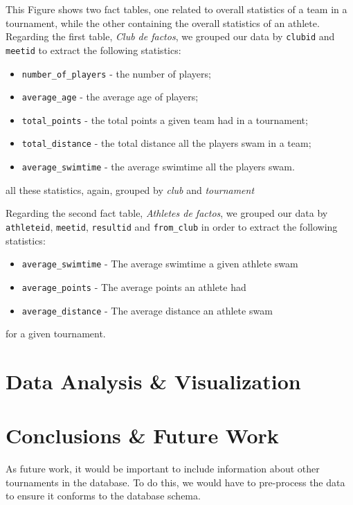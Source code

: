 \documentclass[a4paper, 11pt]{article}
\begin{document}
This Figure shows two fact tables, one related to overall statistics of a team in a tournament, while the other containing the overall statistics of an athlete. Regarding the first table, \textit{Club de factos}, we grouped our data by \texttt{clubid} and \texttt{meetid} to extract the following statistics:

\begin{itemize}
    \item \texttt{number\_of\_players} - the number of players;
    
    \item \texttt{average\_age} - the average age of players;
    
    \item \texttt{total\_points} - the total points a given team had in a tournament;
    \item \texttt{total\_distance} - the total distance all the players swam in a team;
    \item \texttt{average\_swimtime} - the average swimtime all the players swam.
\end{itemize}

all these statistics, again, grouped by \textit{club} and \textit{tournament}

Regarding the second fact table, \textit{Athletes de factos}, we grouped our data by \texttt{athleteid}, \texttt{meetid}, \texttt{resultid} and \texttt{from\_club} in order to extract the following statistics:

\begin{itemize}
    \item \texttt{average\_swimtime} - The average swimtime a given athlete swam
    \item \texttt{average\_points} - The average points an athlete had
    \item \texttt{average\_distance} - The average distance an athlete swam
\end{itemize}

for a given tournament.

\pagebreak

\section{Data Analysis \& Visualization} \label{sec:analysis}


\pagebreak

\section{Conclusions \& Future Work} \label{sec:conclusion}

As future work, it would be important to include information about other tournaments in the database.
To do this, we would have to pre-process the data to ensure it conforms to the database schema.
\end{document}
